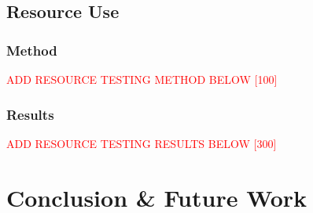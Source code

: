 \documentclass[12pt,twoside,a4paper]{report}
\begin{document}
	\section{Resource Use}
	
	\subsection{Method}
	\textcolor{red}{ADD RESOURCE TESTING METHOD BELOW [100]}
	
	\subsection{Results}
	\textcolor{red}{ADD RESOURCE TESTING RESULTS BELOW [300]}

	\chapter{Conclusion \& Future Work}
	\label{chapter:CONC}

	
	

	\appendix    
\end{document}
